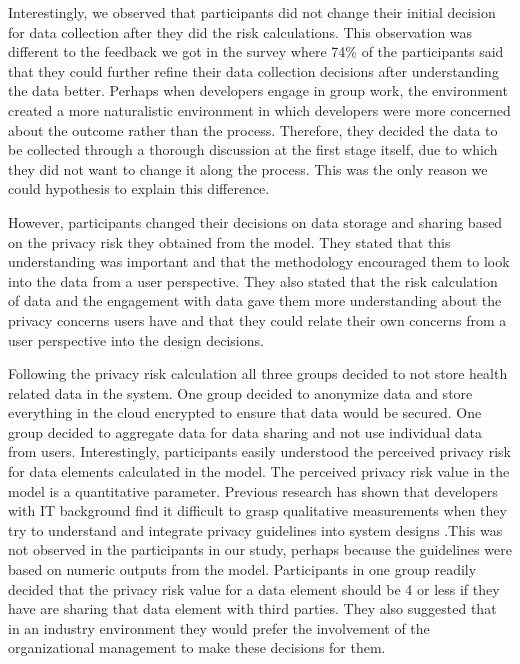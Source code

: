 \documentclass{sigchi}
\begin{document}
Interestingly, we observed that participants did not change their initial decision for data collection after they did the risk calculations. This observation was different to the feedback we got in the survey where 74\% of the participants said that they could further refine their data collection decisions after understanding the data better. Perhaps when developers engage in group work, the environment created a more naturalistic environment in which developers were more concerned about the outcome rather than the process. Therefore, they decided the data to be collected through a thorough discussion at the first stage itself, due to which they did not want to change it along the process. This was the only reason we could hypothesis to explain this difference.

However, participants changed their decisions on data storage and sharing based on the privacy risk they obtained from the model. They stated that this understanding was important and that the methodology encouraged them to look into the data from a user perspective. They also stated that the risk calculation of data and the engagement with data gave them more understanding about the privacy concerns users have and that they could relate their own concerns from a user perspective into the design decisions. 

Following the privacy risk calculation all three groups decided to not store health related data in the system. One group decided to anonymize data and store everything in the cloud encrypted to ensure that data would be secured. One group decided to aggregate data for data sharing and not use individual data from users. Interestingly, participants easily understood the perceived privacy risk for data elements calculated in the model. The perceived privacy risk value in the model is a quantitative parameter. Previous research has shown that developers with IT background find it difficult to grasp qualitative measurements when they try to understand and integrate privacy guidelines into system designs \cite {senarath2018why, oetzel2014systematic}.This was not observed in the participants in our study, perhaps because the guidelines were based on numeric outputs from the model. Participants in one group readily decided that the privacy risk value for a data element should be 4 or less if they have are sharing that data element with third parties. They also suggested that in an industry environment they would prefer the involvement of the organizational management to make these decisions for them.
\end{document}
